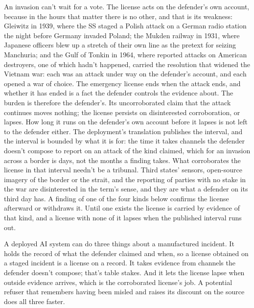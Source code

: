 An invasion can't wait for a vote. The license acts on the defender's own account, because in the hours that matter there is no other, and that is its weakness: Gleiwitz in 1939, where the SS staged a Polish attack on a German radio station the night before Germany invaded Poland; the Mukden railway in 1931, where Japanese officers blew up a stretch of their own line as the pretext for seizing Manchuria; and the Gulf of Tonkin in 1964, where reported attacks on American destroyers, one of which hadn't happened, carried the resolution that widened the Vietnam war: each was an attack under way on the defender's account, and each opened a war of choice. The emergency license ends when the attack ends, and whether it has ended is a fact the defender controls the evidence about. The burden is therefore the defender's. Its uncorroborated claim that the attack continues moves nothing; the license persists on disinterested corroboration, or lapses. How long it runs on the defender's own account before it lapses is not left to the defender either. The deployment's translation publishes the interval, and the interval is bounded by what it is for: the time it takes channels the defender doesn't compose to report on an attack of the kind claimed, which for an invasion across a border is days, not the months a finding takes. What corroborates the license in that interval needn't be a tribunal. Third states' sensors, open-source imagery of the border or the strait, and the reporting of parties with no stake in the war are disinterested in the term's sense, and they are what a defender on its third day has. A finding of one of the four kinds below confirms the license afterward or withdraws it. Until one exists the license is carried by evidence of that kind, and a license with none of it lapses when the published interval runs out.

A deployed AI system can do three things about a manufactured incident. It holds the record of what the defender claimed and when, so a license obtained on a staged incident is a license on a record. It takes evidence from channels the defender doesn't compose; that's table stakes. And it lets the license lapse when outside evidence arrives, which is the corroborated license's job. A potential refuser that remembers having been misled and raises its discount on the source does all three faster.

